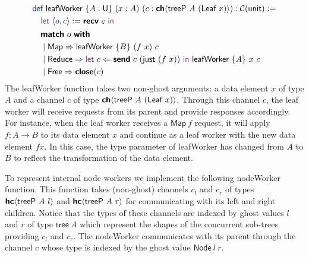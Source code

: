\vspace{-1em}
\begingroup
\small
\addtolength{\jot}{-0.25em}
\begin{align*}
  &\Def\ \textsf{leafWorker}\ \{A : \Un\}\ (x : A)\ (c : \CH{\textsf{treeP}\ A\ (\textsf{Leaf}\ x)}) : \CM{\textsf{unit}} := \\
  &\quad\Let\ \langle{o, c}\rangle := \Recv\ c\ \In \\
  &\quad
    \begin{alignedat}{4}
      &\Match\ o\ \With\\
      &\mid \textsf{Map} \Rightarrow \textsf{leafWorker}\ \{B\}\ (f\ x)\ c \\
      &\mid \textsf{Reduce} \Rightarrow \Let\ c \Leftarrow \Send\ c\ (\textsf{just}\ (f\ x))\ \In\ \textsf{leafWorker}\ \{A\}\ x\ c  \\
      &\mid \textsf{Free} \Rightarrow \Close(c)
    \end{alignedat}
\end{align*}
\endgroup
The \textsf{leafWorker} function takes two non-ghost arguments: a data element
$x$ of type $A$ and a channel $c$ of type
$\CH{\textsf{treeP}\ A\ (\textsf{Leaf}\ x)}$. Through this channel $c$, the leaf
worker will receive requests from its parent and provide responses accordingly.
For instance, when the leaf worker receives a $\textsf{Map}\ f$ request, it will
apply $f: A \rightarrow B$ to its data element $x$ and continue as a leaf worker
with the new data element $f x$. In this case, the type parameter of
\textsf{leafWorker} has changed from $A$ to $B$ to reflect the transformation of
the data element.

To represent internal node workers we implement the following \textsf{nodeWorker}
function. This function takes (non-ghost) channels $c_l$ and $c_r$ of
types ${\textbf{\textsf{hc}}\langle{\textsf{treeP}\ A\ l}\rangle}$ and ${\textbf{\textsf{hc}}\langle{\textsf{treeP}\ A\ r}\rangle}$ for
communicating with its left and right children. Notice that the types of these
channels are indexed by ghost values $l$ and $r$ of type $\textsf{tree}\ A$
which represent the shapes of the concurrent sub-trees providing $c_l$ and
$c_r$. The \textsf{nodeWorker} communicates with its parent through the channel
$c$ whose type is indexed by the ghost value $\textsf{Node}\ l\ r$.

